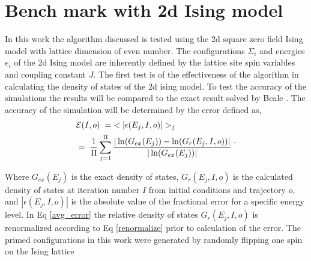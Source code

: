 \documentclass[aps,prl,reprint,superscriptaddress,showkeys]{revtex4-1}
\begin{document}
 

\section{Bench mark with 2d Ising model}
In this work the algorithm discussed is tested using the 2d square zero field  Ising model with lattice dimension of even number\cite{exact_statistical,Onsager,Ising}.  The configurations $\Sigma_i$ and energies $e_i$ of the 2d Ising model are inherently defined by the lattice site spin variables and coupling constant $J$.   The first test is of the effectiveness of the algorithm in calculating the density of states of the 2d ising model.  To test the accuracy of the simulations the results will be compared to the exact result solved by Beale \cite{Beale_2d_ising}. The accuracy of the simulation will be determined by the error defined as, 
\begin{equation}
\begin{split}
 &\mathcal{E}(I,o) \hspace{0.1cm}= \hspace{0.1cm}< |\epsilon(E_j,I,o)| >_j\\
& = \hspace{0.1cm}  \frac{1}{\Pi} \sum_{j=1}^{\Pi}\frac{|\ln(G_{ex}(E_j))- \ln(G_{r}(E_j,I,o))|}{|\ln(G_{ex}(E_j))|}\; 
 \end{split}. 
 \label{avg_error}
\end{equation}

Where $G_{ex}(E_j)$ is the exact density of states, $G_{r}(E_j,I,o)$ is the calculated density of states  at iteration number $I$ from initial conditions and trajectory $o$, and $|\epsilon(E_j,I,o)|$ is the absolute value of the fractional error for a specific energy level. In Eq \ref{avg_error} the relative density of states $G_{r}(E_j,I,o)$ is renormalized according to Eq \ref{renormalize} prior to calculation of the error.  The primed configurations in this work were generated by randomly flipping one spin on the Ising lattice
\end{document}
